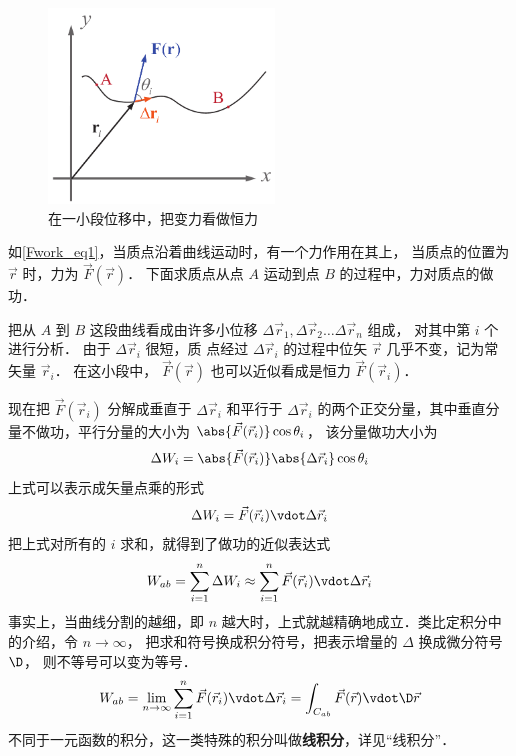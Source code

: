 

\begin{figure}[ht]
\centering
\includegraphics[width=6cm]{./figures/Fwork.pdf}
\caption{在一小段位移中，把变力看做恒力}\label{Fwork_eq1}
\end{figure}

如\autoref{Fwork_eq1}，当质点沿着曲线运动时，有一个力作用在其上， 当质点的位置为 $\vec r$ 时，力为 $\vec F(\vec r)$． 下面求质点从点 $A$ 运动到点 $B$ 的过程中，力对质点的做功．

把从 $A$ 到 $B$ 这段曲线看成由许多小位移 $\Delta {\vec r_1}, \Delta {\vec r_2}\dots\Delta {\vec r_n}$ 组成， 对其中第 $i$ 个进行分析． 由于 $\Delta {\vec r_i}$ 很短，质
点经过 $\Delta {\vec r_i}$ 的过程中位矢 $\vec r$ 几乎不变，记为常矢量 ${\vec r_i}$． 在这小段中，  $\vec F(\vec r)$ 也可以近似看成是恒力 $\vec F(\vec r_i)$． 

现在把 $\vec F(\vec r_i)$ 分解成垂直于 $\Delta {\vec r_i}$ 和平行于 $\Delta {\vec r_i}$ 的两个正交分量，其中垂直分量不做功，平行分量的大小为 $ \abs{\vec F(\vec r_i)} \cos \theta _i$， 该分量做功大小为
\begin{equation}
\Delta {W_i} = \abs{\vec F(\vec r_i)} \abs{\Delta \vec r_i} \cos \theta _i
\end{equation}
上式可以表示成矢量点乘的形式
\begin{equation}\label{Fwork_eq2}
\Delta {W_i} = \vec F(\vec r_i) \vdot \Delta \vec r_i
\end{equation}
把上式对所有的 $i$ 求和，就得到了做功的近似表达式
\begin{equation}
W_{ab} = \sum_{i = 1}^n \Delta {W_i}  \approx \sum_{i = 1}^n \vec F(\vec r_i) \vdot \Delta \vec r_i 
\end{equation} 
事实上，当曲线分割的越细，即 $n$ 越大时，上式就越精确地成立．类比定积分中的介绍，令 $n \to \infty $， 把求和符号换成积分符号，把表示增量的 $\Delta $ 换成微分符号 $\D$， 则不等号可以变为等号．
\begin{equation}
{W_{ab}} = \lim_{n \to \infty } \sum_{i = 1}^n \vec F(\vec r_i) \vdot \Delta \vec r_i  = \int_{C_{ab}} \vec F(\vec r) \vdot \D \vec r
\end{equation} 
不同于一元函数的积分，这一类特殊的积分叫做\textbf{线积分}，详见“线积分”．

